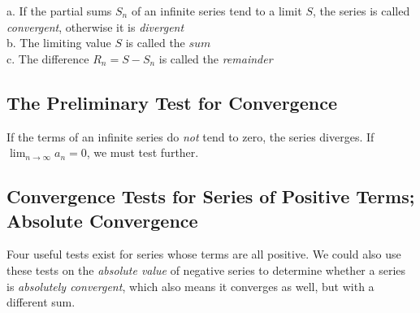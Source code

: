 \documentclass[svgnames]{article}   	%
\begin{document}
\begin{tcolorbox}	
  
  a. If the partial sums $S_n$ of an infinite series tend to a limit $S$, the
  series is called \textit{convergent}, otherwise it is \textit{divergent} \\
  b. The limiting value $S$ is called the $sum$ \\
  c. The difference $R_n = S - S_n$ is called the \textit{remainder}

\end{tcolorbox}	

\subsection{The Preliminary Test for Convergence}
\vspace{5px}

If the terms of an infinite series do \textit{not} tend to zero, the series
diverges. If $\lim_{n\to\infty} a_n = 0$, we must test further. 

\subsection{Convergence Tests for Series of Positive Terms; Absolute
Convergence}
\vspace{5px}

Four useful tests exist for series whose terms are all positive. We could also
use these tests on the \textit{absolute value} of negative series to determine
whether a series is \textit{absolutely convergent}, which also means it
converges as well, but with a different sum. 
\end{document}
